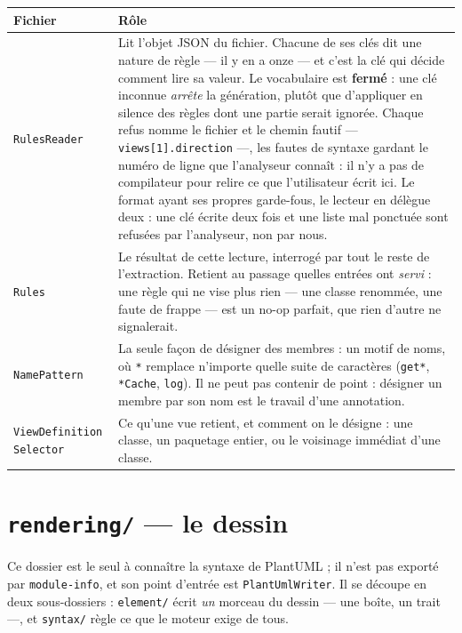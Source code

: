 \documentclass[12pt, a4paper]{article}
\begin{document}
\begin{longtable}{L{4.2cm} L{10cm}}
\toprule
\textbf{Fichier} & \textbf{Rôle} \\
\midrule
\endhead
\texttt{RulesReader} &
Lit l'objet JSON du fichier. Chacune de ses clés dit une nature de règle — il y en a onze — et
c'est la clé qui décide comment lire sa valeur. Le vocabulaire est \textbf{fermé} : une clé
inconnue \emph{arrête} la génération, plutôt que d'appliquer en silence des règles dont une partie
serait ignorée. Chaque refus nomme le fichier et le chemin fautif — \texttt{views[1].direction} —,
les fautes de syntaxe gardant le numéro de ligne que l'analyseur connaît : il n'y a pas de
compilateur pour relire ce que l'utilisateur écrit ici. Le format ayant ses propres garde-fous, le
lecteur en délègue deux : une clé écrite deux fois et une liste mal ponctuée sont refusées par
l'analyseur, non par nous. \\
\addlinespace
\texttt{Rules} &
Le résultat de cette lecture, interrogé par tout le reste de l'extraction. Retient au passage
quelles entrées ont \emph{servi} : une règle qui ne vise plus rien — une classe renommée, une
faute de frappe — est un no-op parfait, que rien d'autre ne signalerait. \\
\addlinespace
\texttt{NamePattern} &
La seule façon de désigner des membres : un motif de noms, où \texttt{*} remplace n'importe
quelle suite de caractères (\texttt{get*}, \texttt{*Cache}, \texttt{log}). Il ne peut pas
contenir de point : désigner un membre par son nom est le travail d'une annotation. \\
\addlinespace
\texttt{ViewDefinition} \newline \texttt{Selector} &
Ce qu'une vue retient, et comment on le désigne : une classe, un paquetage entier, ou le
voisinage immédiat d'une classe. \\
\bottomrule
\end{longtable}

\section{\texttt{rendering/} — le dessin}

Ce dossier est le seul à connaître la syntaxe de PlantUML ; il n'est pas exporté par
\texttt{module-info}, et son point d'entrée est \texttt{PlantUmlWriter}. Il se découpe en deux sous-dossiers : \texttt{element/} écrit \emph{un} morceau du dessin
— une boîte, un trait —, et \texttt{syntax/} règle ce que le moteur exige de tous.
\end{document}
